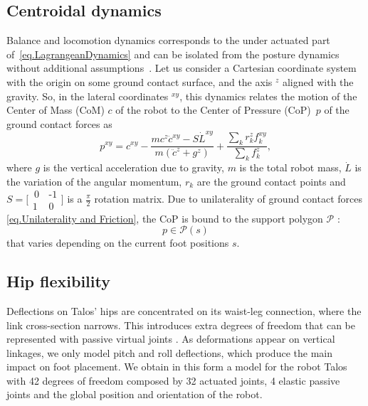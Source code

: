 \documentclass[letterpaper, 10 pt, conference]{ieeeconf}  %
\begin{document}
\subsection{Centroidal dynamics}
Balance and locomotion dynamics corresponds to the under actuated part of~\eqref{eq.LagrangeanDynamics} and can be isolated from the posture dynamics without additional assumptions~\cite{Wieber2006holonomy,herzog2015trajectory}. Let us consider a Cartesian coordinate system with the origin on some ground contact surface, and the axis $ ^z $ aligned with the gravity. So, in the lateral coordinates $^{xy}$, this dynamics relates the motion of the Center of Mass (CoM) $c$ of the robot to the Center of Pressure (CoP)~$p$ of the ground contact forces \cite[Chapter 2]{Villa2019managing} as
\begin{equation}\label{eq.CentroidalDynamics}
    p^{xy} = c^{xy} - \dfrac{mc^{z}\ddot{c}^{xy}-S\dot{L}^{xy}}{m(\ddot{c}^{z}+g^{z})} + \dfrac{\sum_k r_{k}^{z} f_{k}^{xy}}{\sum_k f_{k}^{z}},
\end{equation}
%
where $g$ is the vertical acceleration due to gravity, $m$ is the total robot mass, $\dot{L}$ is the variation of the angular momentum, $r_k$ are the ground contact points and $ S=\big[\begin{smallmatrix}\,0\, & \texttt{-}1\\1\, &0
\end{smallmatrix}\big]$ is a $\frac{\pi}{2}$ rotation matrix. Due to unilaterality of ground contact forces \eqref{eq.Unilaterality and Friction}, the CoP is bound to the support polygon $\mathcal{P}$ \cite{Handbook}:
\begin{equation}\label{eq.DynamicConstraint}
    p\in\mathcal{P}(s)
\end{equation}
%
that varies depending on the current foot positions $s$.

\subsection{Hip flexibility}

Deflections on Talos' hips are concentrated on its waist-leg connection, where the link cross-section narrows. This introduces extra degrees of freedom that can be represented with passive virtual joints \cite{Nakaoka2007constraint}. As deformations appear on vertical linkages, we only model pitch and roll deflections, which produce the main impact on foot placement. We obtain in this form a model for the robot Talos with 42 degrees of freedom composed by 32 actuated joints, 4 elastic passive joints and the global position and orientation of the robot.
\end{document}
